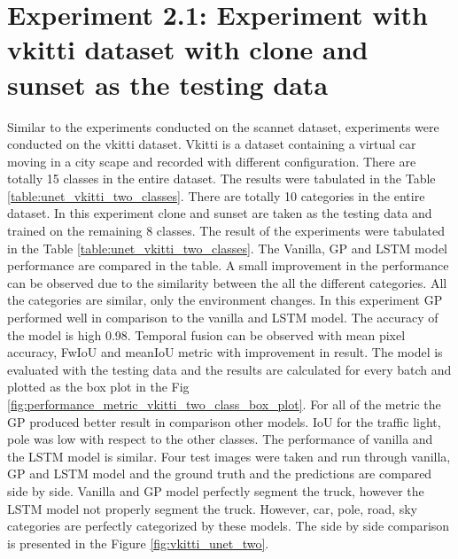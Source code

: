 	\newpage
	\newpage
	
	\section{Experiment 2.1: Experiment with vkitti dataset with clone and sunset as the testing data}
	
	Similar to the experiments conducted on the scannet dataset, experiments were conducted on the vkitti dataset. Vkitti is a dataset containing a virtual car moving in a city scape and recorded with different configuration. There are totally 15 classes in the entire dataset. The results were tabulated in the Table \ref{table:unet_vkitti_two_classes}. There are totally 10 categories in the entire dataset. In this experiment clone and sunset are taken as the testing data and trained on the remaining 8 classes. The result of the experiments were tabulated in the Table \ref{table:unet_vkitti_two_classes}. The Vanilla, GP and LSTM model performance are compared in the table. A small improvement in the performance can be observed due to the similarity between the all the different categories. All the categories are similar, only the environment changes. In this experiment GP performed well in comparison to the vanilla and LSTM model. The accuracy of the model is high 0.98. Temporal fusion can be observed with mean pixel accuracy, FwIoU and meanIoU metric with improvement in result. The model is evaluated with the testing data and the results are calculated for every batch and plotted as the box plot in the Fig \ref{fig:performance_metric_vkitti_two_class_box_plot}. For all of the metric the GP produced better result in comparison other models. IoU for the traffic light, pole was low with respect to the other classes. The performance of vanilla and the LSTM model is similar. Four test images were taken and run through vanilla, GP and LSTM model and the ground truth and the predictions are compared side by side. Vanilla and GP model perfectly segment the truck, however the LSTM model not properly segment the truck. However, car, pole, road, sky categories are perfectly categorized by these models. The side by side comparison is presented in the Figure \ref{fig:vkitti_unet_two}. 
	
